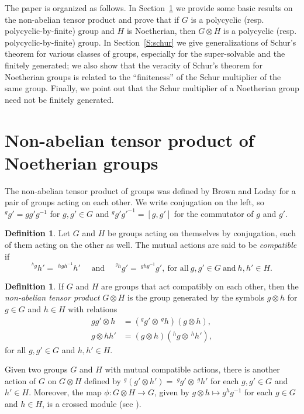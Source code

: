 \documentclass[12pt,reqno]{amsart}
\theoremstyle{definition}
\newtheorem{definition}[subsection]{Definition}
\numberwithin{equation}{section}
\theoremstyle{definition}
\begin{document}
The paper is organized as follows. In Section~\ref{S:noab} we provide
some basic results on the non-abelian tensor product and prove  that if $G$ is a polycyclic (resp. polycyclic-by-finite) group and $H$ is Noetherian, then $G\otimes H$ is a polycyclic (resp. polycyclic-by-finite) group.
In Section~\ref{S:schur} we give generalizations of Schur's theorem for various classes of
groups, especially for the super-solvable and the finitely
generated; we also show that the veracity of Schur's theorem for Noetherian groups is related to the ``finiteness'' of the Schur multiplier of the same group. Finally, we point out that the Schur multiplier of a Noetherian group need not be finitely generated.



\section{Non-abelian tensor product of Noetherian groups}\label{S:noab}
The non-abelian tensor product of groups was defined by Brown and Loday \cite{BroLod84, BroLod87} for a pair of groups
acting on each other. We write conjugation on the left, so $^gg'=gg'g^{-1}$ for $g,g'\in G$
and $^gg'g'^{-1}=[g,g']$ for the commutator of $g$ and $g'$.

\begin{definition}\label{D:2.1}
Let $G$ and $H$ be groups acting on themselves by conjugation, each of them acting on the other as well. The mutual actions are said to be \emph{compatible} if
\[
  ^{^h g}h'=\; ^{hgh^{-1}}h' \quad \text{ and }  \quad ^{^g h}g'=\ ^{ghg^{-1}}g', \ \text{for all} \ g,g'\in G \ \text{and} \  h,h'\in H.
\]
\end{definition}


\begin{definition}
If $G$ and $H$ are groups that act compatibly on each other, then the \emph{non-abelian tensor product} $G\otimes H$
is the group generated by the symbols $g\otimes h$ for $g\in G$ and $h\in H$ with relations
\begin{align*}
gg'\otimes h & =(^gg'\otimes \,^gh)(g\otimes h), \\
g\otimes hh' & =(g\otimes h)(^hg\otimes \,^hh'),
\end{align*}
for all $g,g'\in G$ and $h,h'\in H$.
\end{definition}


Given two groups $G$ and $H$ with mutual compatible actions, there is another action of $G$ on $G\otimes H$ defined by
$^g(g'\otimes h')=\:^gg'\otimes \:^gh'$ for each $g, g'\in G$ and $h'\in H$. Moreover, the map $\phi \colon G\otimes H
\to G$, given by $g\otimes h\mapsto g^hg^{-1}$ for each $g\in G$ and $h\in H$, is a crossed module (see  \cite[Proposition 2.3]{BroLod87}).
\end{document}
